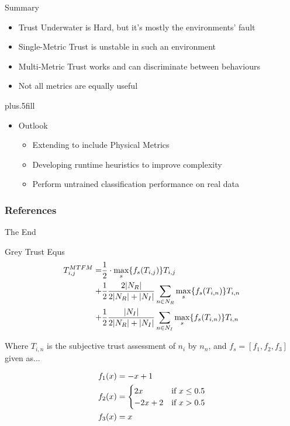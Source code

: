 \documentclass{beamer}
\begin{document}
\begin{frame}{Summary}

  \begin{itemize}
    \item Trust Underwater is \alert{Hard}, but it's mostly the environments' fault
    \item Single-Metric Trust is \alert{unstable} in such an environment
    \item Multi-Metric Trust works and can \alert{discriminate between behaviours}
    \item \alert{Not all metrics} are equally useful
  \end{itemize}
  
  \vskip0pt plus.5fill
  \begin{itemize}
  \item
    Outlook
    \begin{itemize}
    \item
      Extending to include Physical Metrics
    \item
      Developing runtime heuristics to improve complexity
    \item 
      Perform untrained classification performance on real data      
    \end{itemize}
  \end{itemize}
\end{frame}

\begin{frame}[t,allowframebreaks]
  \frametitle{References}
  \printbibliography[title=References]%
\end{frame}

\begin{frame}
  \centerline{The End}
\end{frame}

\begin{frame}[allowframebreaks]{Grey Trust Equs}
  \begin{align}
    \label{eq:networkeffects}
    T_{i,j}^{MTFM}=&\frac{1}{2} \cdot \max_s\{f_s(T_{i,j})\} T_{i,j}\\ \notag
    +&\frac{1}{2} \frac{2|N_R| }{2|N_R| + |N_I|}\sum_{n \in N_R} \max_s\{f_s(T_{i,n})\} T_{i,n}\\ \notag
    +&\frac{1}{2} \frac{|N_I| }{2|N_R| + |N_I|}\sum_{n \in N_I} \max_s\{f_s(T_{i,n})\} T_{i,n} 
  \end{align}

  Where $T_{i,n}$ is the subjective trust assessment of $n_i$ by $n_n$, and $f_s = [ f_1,f_2, f_3]$ given as...

  \framebreak

  \begin{align}
    \label{eq:whitenization}
    f_1(x)&= -x+1\notag\\
    f_2(x)&= 
    \begin{cases}
      2x & \text{if }x\leq 0.5\\
      -2x+2 & \text{if }x>0.5
    \end{cases}\\
    f_3(x)&= x\notag
  \end{align}
\end{frame}
\end{document}

